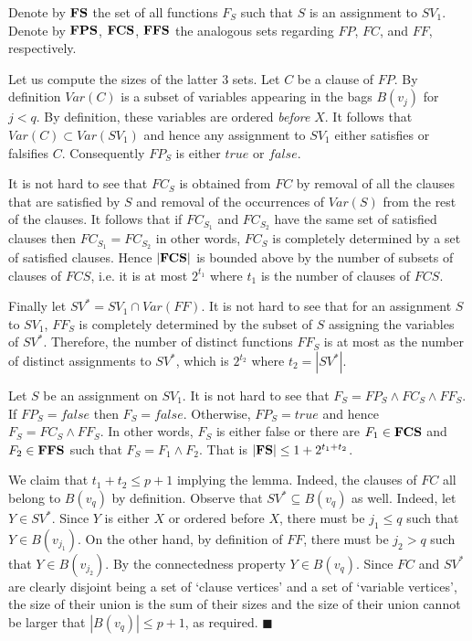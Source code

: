 \documentclass{article}
\begin{document}
Denote by ${\bf FS}$ the set of all functions $F_S$ such that $S$ is an assignment
to $SV_1$. Denote by ${\bf FPS}$, ${\bf FCS}$, ${\bf FFS}$ the analogous sets regarding
$FP$, $FC$, and $FF$, respectively. 

Let us compute the sizes of the latter $3$ sets. Let $C$ be a clause of $FP$. 
By definition $Var(C)$ is a subset of variables appearing in the bags $B(v_j)$
for $j<q$. By definition, these variables are ordered \emph{before} $X$. It follows
that $Var(C) \subset Var(SV_1)$ and hence any assignment to $SV_1$ either satisfies or
falsifies $C$. Consequently $FP_S$ is either $true$ or $false$.

It is not hard to see that $FC_S$ is obtained from $FC$ by removal of all the clauses
that are satisfied by $S$ and removal of the occurrences of $Var(S)$ from the rest of the 
clauses. It follows that if $FC_{S_1}$ and $FC_{S_2}$ have the same set of satisfied 
clauses then $FC_{S_1}=FC_{S_2}$ in other words, $FC_S$ is completely determined by
a set of satisfied clauses. Hence $|{\bf FCS}|$ is bounded above by the number of 
subsets of clauses of $FCS$, i.e. it is at most $2^{t_1}$ where $t_1$ is the number of 
clauses of $FCS$.

Finally let $SV^*=SV_1 \cap Var(FF)$. It is not hard to see that for an assignment $S$
to $SV_1$, $FF_S$ is completely determined by the subset of $S$ assigning the variables
of $SV^*$. Therefore, the number of distinct functions $FF_S$ is at most
as the number of distinct assignments to $SV^*$, which is $2^{t_2}$ where $t_2=|SV^*|$.

Let $S$ be an assignment on $SV_1$. It is not hard to see that 
$F_S=FP_S \wedge FC_S \wedge FF_S$. If $FP_S=false$ then $F_S=false$. Otherwise,
$FP_S=true$ and hence $F_S=FC_S \wedge FF_S$. In other words, $F_S$ is either false
or there are $F_1 \in {\bf FCS}$ and $F_2 \in {\bf FFS}$ such that $F_S=F_1 \wedge F_2$.
That is $|{\bf FS}| \leq 1+2^{t_1+t_2}$. 

We claim that $t_1+t_2 \leq p+1$ implying the lemma. Indeed, the clauses of $FC$ all belong to
$B(v_q)$ by definition. Observe that $SV^* \subseteq B(v_q)$ as well.
Indeed, let $Y \in SV^*$. Since $Y$ is either $X$ or ordered before $X$,
there must be $j_1 \leq q$ such that $Y \in B(v_{j_1})$. On the other hand,
by definition of $FF$, there must be $j_2>q$ such that $Y \in B(v_{j_2})$.
By the connectedness property $Y \in B(v_q)$. Since $FC$ and $SV^*$ are clearly
disjoint being a set of `clause vertices' and a set of `variable vertices', 
the size of their union is the sum of their sizes and the size of their union cannot be larger
that $|B(v_q)| \leq p+1$, as required. $\blacksquare$
\end{document}
